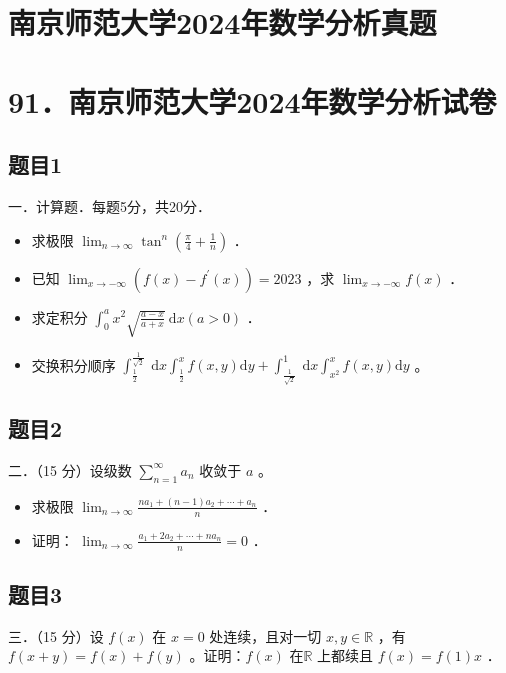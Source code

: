 \documentclass{article}
\begin{document}
\section*{南京师范大学2024年数学分析真题}
\section*{91．南京师范大学2024年数学分析试卷}

\subsection{题目1}
一．计算题．每题5分，共20分．

\begin{itemize}
  \item[（1）] 求极限 \(\lim _{n \rightarrow \infty} \tan ^{n}\left(\frac{\pi}{4}+\frac{1}{n}\right)\) ．
  \item[（2）] 已知 \(\lim _{x \rightarrow-\infty}\left(f(x)-f^{\prime}(x)\right)=2023\) ，求 \(\lim _{x \rightarrow-\infty} f(x)\) ．
  \item[（3）] 求定积分 \(\int_{0}^{a} x^{2} \sqrt{\frac{a-x}{a+x}} \mathrm{~d} x(a>0)\) ．
  \item[（4）] 交换积分顺序 \(\int_{\frac{1}{2}}^{\frac{1}{\sqrt{2}}} \mathrm{~d} x \int_{\frac{1}{2}}^{x} f(x, y) \mathrm{d} y+\int_{\frac{1}{\sqrt{2}}}^{1} \mathrm{~d} x \int_{x^{2}}^{x} f(x, y) \mathrm{d} y\) 。
\end{itemize}

\subsection{题目2}
二．（15 分）设级数 \(\sum_{n=1}^{\infty} a_{n}\) 收敛于 \(a\) 。

\begin{itemize}
  \item[（1）] 求极限 \(\lim _{n \rightarrow \infty} \frac{n a_{1}+(n-1) a_{2}+\cdots+a_{n}}{n}\) ．
  \item[（2）] 证明： \(\lim _{n \rightarrow \infty} \frac{a_{1}+2 a_{2}+\cdots+n a_{n}}{n}=0\) ．
\end{itemize}

\subsection{题目3}
三．（15 分）设 \(f(x)\) 在 \(x=0\) 处连续，且对一切 \(x, y \in \mathbb{R}\) ，有 \(f(x+y)=f(x)+f(y)\) 。证明：\(f(x)\) 在\(\mathbb{R}\) 上都续且 \(f(x)=f(1) x\) ．
\end{document}
